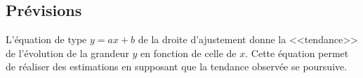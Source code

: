 \documentclass[12pt,a4paper]{article}
\begin{document}


\subsection{Prévisions}

\begin{myprop}
	L'équation de type $y = ax +b $ de la droite d'ajustement donne la <<tendance>> de l'évolution de la grandeur $y$ en fonction de celle de $x$. Cette équation permet de réaliser des estimations en supposant que la tendance observée se poursuive.
\end{myprop}


\end{document}
